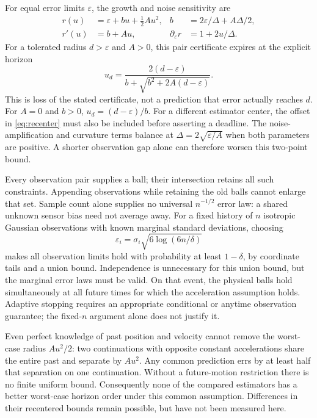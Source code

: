 \documentclass[journal]{IEEEtran}
\begin{document}
For equal error limits $\varepsilon$, the growth and noise sensitivity are
\begin{align}
 r(u)&=\varepsilon+b u+\tfrac12Au^2,
 &b&=2\varepsilon/\Delta+A\Delta/2,\\
 r'(u)&=b+Au,
 &\partial_\varepsilon r&=1+2u/\Delta.
 \label{eq:breakdown-rate}
\end{align}
For a tolerated radius $d>\varepsilon$ and $A>0$, this pair certificate
expires at the explicit horizon
\begin{equation}
 u_d=\frac{2(d-\varepsilon)}{b+\sqrt{b^2+2A(d-\varepsilon)}}.
 \label{eq:expiry}
\end{equation}
This is loss of the stated certificate, not a prediction that error
actually reaches $d$. For $A=0$ and $b>0$, $u_d=(d-\varepsilon)/b$.
For a different estimator center, the offset in \eqref{eq:recenter} must
also be included before asserting a deadline. The noise-amplification
and curvature terms balance at $\Delta=2\sqrt{\varepsilon/A}$ when both
parameters are positive. A shorter observation gap alone can therefore
worsen this two-point bound.

Every observation pair supplies a ball; their intersection retains all
such constraints. Appending observations while retaining the old balls
cannot enlarge that set. Sample count alone supplies no universal
$n^{-1/2}$ error law: a shared unknown sensor bias need not average away.
For a fixed history of $n$ isotropic Gaussian observations with known
marginal standard deviations, choosing
\begin{equation}
 \varepsilon_i=\sigma_i\sqrt{6\log(6n/\delta)}
\end{equation}
makes all observation limits hold with probability at least $1-\delta$,
by coordinate tails and a union bound. Independence is unnecessary for
this union bound, but the marginal error laws must be valid. On that
event, the physical balls hold simultaneously at all future times for
which the acceleration assumption holds. Adaptive stopping requires an
appropriate conditional or anytime observation guarantee; the fixed-$n$
argument alone does not justify it.

Even perfect knowledge of past position and velocity cannot remove the
worst-case radius $Au^2/2$: two continuations with opposite constant
accelerations share the entire past and separate by $Au^2$. Any common
prediction errs by at least half that separation on one continuation.
Without a future-motion restriction there is no finite uniform bound.
Consequently none of the compared estimators has a better worst-case
horizon order under this common assumption. Differences in their
recentered bounds remain possible, but have not been measured here.
\end{document}
